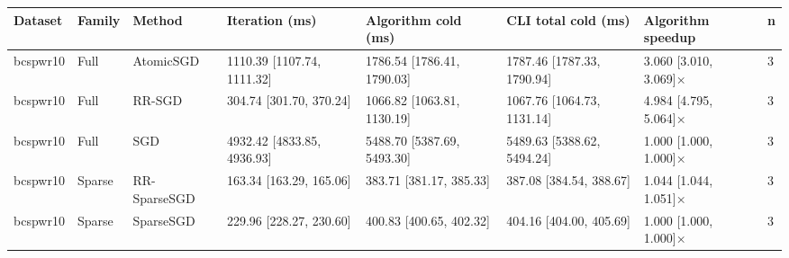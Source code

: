 \begin{tabular}{llllllll}
\hline
Dataset & Family & Method & Iteration (ms) & Algorithm cold (ms) & CLI total cold (ms) & Algorithm speedup & n \\
\hline
bcspwr10 & Full & AtomicSGD & 1110.39 [1107.74, 1111.32] & 1786.54 [1786.41, 1790.03] & 1787.46 [1787.33, 1790.94] & 3.060 [3.010, 3.069]× & 3 \\
bcspwr10 & Full & RR-SGD & 304.74 [301.70, 370.24] & 1066.82 [1063.81, 1130.19] & 1067.76 [1064.73, 1131.14] & 4.984 [4.795, 5.064]× & 3 \\
bcspwr10 & Full & SGD & 4932.42 [4833.85, 4936.93] & 5488.70 [5387.69, 5493.30] & 5489.63 [5388.62, 5494.24] & 1.000 [1.000, 1.000]× & 3 \\
bcspwr10 & Sparse & RR-SparseSGD & 163.34 [163.29, 165.06] & 383.71 [381.17, 385.33] & 387.08 [384.54, 388.67] & 1.044 [1.044, 1.051]× & 3 \\
bcspwr10 & Sparse & SparseSGD & 229.96 [228.27, 230.60] & 400.83 [400.65, 402.32] & 404.16 [404.00, 405.69] & 1.000 [1.000, 1.000]× & 3 \\
\hline
\end{tabular}
